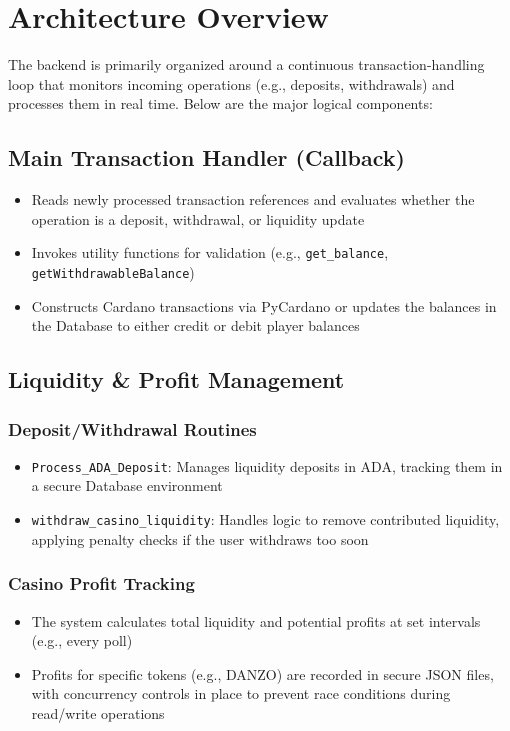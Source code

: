 \documentclass[11pt,a4paper]{report}
\begin{document}
\section{Architecture Overview}
The backend is primarily organized around a continuous transaction-handling loop that monitors incoming operations (e.g., deposits, withdrawals) and processes them in real time. Below are the major logical components:

\subsection{Main Transaction Handler (Callback)}
\begin{itemize}
    \item Reads newly processed transaction references and evaluates whether the operation is a deposit, withdrawal, or liquidity update
    \item Invokes utility functions for validation (e.g., \texttt{get\_balance}, \texttt{getWithdrawableBalance})
    \item Constructs Cardano transactions via PyCardano or updates the balances in the Database to either credit or debit player balances
\end{itemize}

\subsection{Liquidity \& Profit Management}

\subsubsection{Deposit/Withdrawal Routines}
\begin{itemize}
    \item \texttt{Process\_ADA\_Deposit}: Manages liquidity deposits in ADA, tracking them in a secure Database environment
    \item \texttt{withdraw\_casino\_liquidity}: Handles logic to remove contributed liquidity, applying penalty checks if the user withdraws too soon
\end{itemize}

\subsubsection{Casino Profit Tracking}
\begin{itemize}
    \item The system calculates total liquidity and potential profits at set intervals (e.g., every poll)
    \item Profits for specific tokens (e.g., DANZO) are recorded in secure JSON files, with concurrency controls in place to prevent race conditions during read/write operations
\end{itemize}
\end{document}

